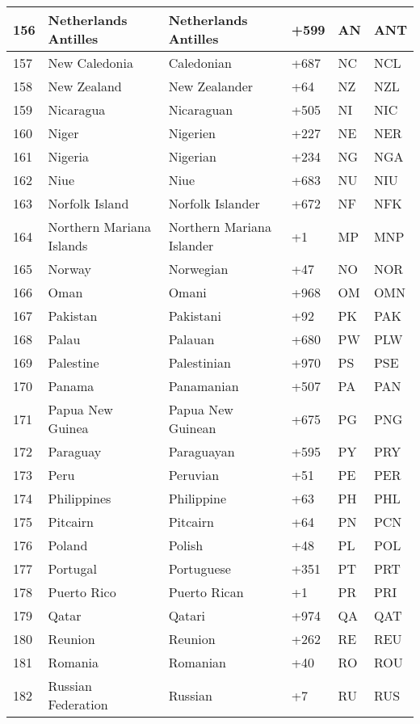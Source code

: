 \begin{longtable}{|l|l|l|l|l|l|}
156 & Netherlands Antilles & Netherlands Antilles & +599 & AN & ANT \\ \hline 
157 & New Caledonia & Caledonian & +687 & NC & NCL \\ \hline 
158 & New Zealand & New Zealander & +64 & NZ & NZL \\ \hline 
159 & Nicaragua & Nicaraguan & +505 & NI & NIC \\ \hline 
160 & Niger & Nigerien & +227 & NE & NER \\ \hline 
161 & Nigeria & Nigerian & +234 & NG & NGA \\ \hline 
162 & Niue & Niue & +683 & NU & NIU \\ \hline 
163 & Norfolk Island & Norfolk Islander & +672 & NF & NFK \\ \hline 
164 & Northern Mariana Islands & Northern Mariana Islander & +1 & MP & MNP \\ \hline 
165 & Norway & Norwegian & +47 & NO & NOR \\ \hline 
166 & Oman & Omani & +968 & OM & OMN \\ \hline 
167 & Pakistan & Pakistani & +92 & PK & PAK \\ \hline 
168 & Palau & Palauan & +680 & PW & PLW \\ \hline 
169 & Palestine & Palestinian & +970 & PS & PSE \\ \hline 
170 & Panama & Panamanian & +507 & PA & PAN \\ \hline 
171 & Papua New Guinea & Papua New Guinean & +675 & PG & PNG \\ \hline 
172 & Paraguay & Paraguayan & +595 & PY & PRY \\ \hline 
173 & Peru & Peruvian & +51 & PE & PER \\ \hline 
174 & Philippines & Philippine & +63 & PH & PHL \\ \hline 
175 & Pitcairn & Pitcairn & +64 & PN & PCN \\ \hline 
176 & Poland & Polish & +48 & PL & POL \\ \hline 
177 & Portugal & Portuguese & +351 & PT & PRT \\ \hline 
178 & Puerto Rico & Puerto Rican & +1 & PR & PRI \\ \hline 
179 & Qatar & Qatari & +974 & QA & QAT \\ \hline 
180 & Reunion & Reunion & +262 & RE & REU \\ \hline 
181 & Romania & Romanian & +40 & RO & ROU \\ \hline 
182 & Russian Federation & Russian & +7 & RU & RUS \\ \hline 

\end{longtable}
